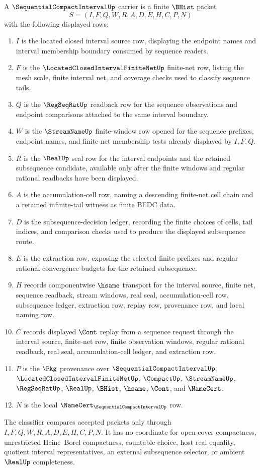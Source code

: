 \begin{definition}
\label{def:sequential-compact-interval-carrier}
A $\SequentialCompactIntervalUp$ carrier is a finite $\BHist$ packet
$$
S=(I,F,Q,W,R,A,D,E,H,C,P,N)
$$
with the following displayed rows:
\begin{enumerate}
\item $I$ is the located closed interval source row, displaying the endpoint names and interval membership boundary consumed by sequence readers.
\item $F$ is the $\LocatedClosedIntervalFiniteNetUp$ finite-net row, listing the mesh scale, finite interval net, and coverage checks used to classify sequence tails.
\item $Q$ is the $\RegSeqRatUp$ readback row for the sequence observations and endpoint comparisons attached to the same interval boundary.
\item $W$ is the $\StreamNameUp$ finite-window row opened for the sequence prefixes, endpoint names, and finite-net membership tests already displayed by $I,F,Q$.
\item $R$ is the $\RealUp$ seal row for the interval endpoints and the retained subsequence candidate, available only after the finite windows and regular rational readbacks have been displayed.
\item $A$ is the accumulation-cell row, naming a descending finite-net cell chain and a retained infinite-tail witness as finite BEDC data.
\item $D$ is the subsequence-decision ledger, recording the finite choices of cells, tail indices, and comparison checks used to produce the displayed subsequence route.
\item $E$ is the extraction row, exposing the selected finite prefixes and regular rational convergence budgets for the retained subsequence.
\item $H$ records componentwise $\hsame$ transport for the interval source, finite net, sequence readback, stream windows, real seal, accumulation-cell row, subsequence ledger, extraction row, replay row, provenance row, and local naming row.
\item $C$ records displayed $\Cont$ replay from a sequence request through the interval source, finite-net row, finite observation windows, regular rational readback, real seal, accumulation-cell ledger, and extraction row.
\item $P$ is the $\Pkg$ provenance over $\SequentialCompactIntervalUp$, $\LocatedClosedIntervalFiniteNetUp$, $\CompactUp$, $\StreamNameUp$, $\RegSeqRatUp$, $\RealUp$, $\BHist$, $\hsame$, $\Cont$, and $\NameCert$.
\item $N$ is the local $\NameCert_{\SequentialCompactIntervalUp}$ row.
\end{enumerate}
The classifier compares accepted packets only through $I,F,Q,W,R,A,D,E,H,C,P,N$. It has no coordinate for open-cover compactness, unrestricted Heine--Borel compactness, countable choice, host real equality, quotient interval representatives, an external subsequence selector, or ambient $\RealUp$ completeness.
\end{definition}

